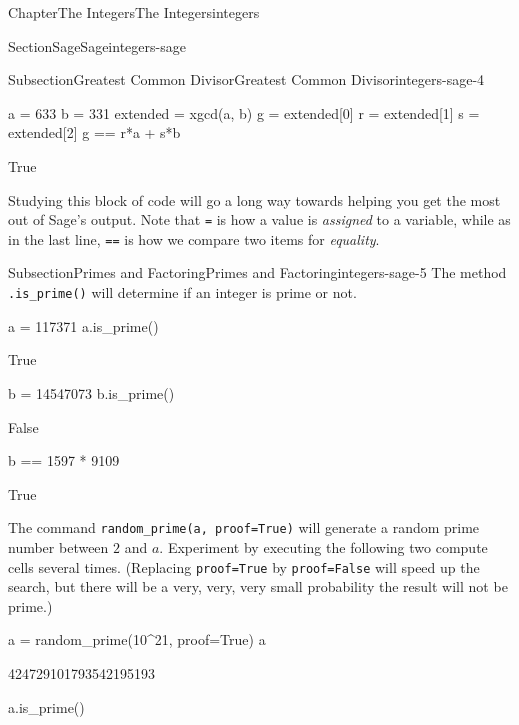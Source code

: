 \documentclass[oneside,10pt,]{book}
\newcommand{\mono}[1]{\texttt{#1}}
\numberwithin{equation}{section}
\begin{document}
\begin{chapterptx}{Chapter}{The Integers}{}{The Integers}{}{}{integers}
\begin{sectionptx}{Section}{Sage}{}{Sage}{}{}{integers-sage}
\begin{subsectionptx}{Subsection}{Greatest Common Divisor}{}{Greatest Common Divisor}{}{}{integers-sage-4}
\begin{sageinput}
a = 633
b = 331
extended = xgcd(a, b)
g = extended[0]
r = extended[1]
s = extended[2]
g == r*a + s*b
\end{sageinput}
\begin{sageoutput}
True
\end{sageoutput}
Studying this block of code will go a long way towards helping you get the most out of Sage's output.  Note that \mono{=} is how a value is \emph{assigned} to a variable, while as in the last line, \mono{==} is how we compare two items for \emph{equality}.%
\end{subsectionptx}
%
%
\typeout{************************************************}
\typeout{************************************************}
%
\begin{subsectionptx}{Subsection}{Primes and Factoring}{}{Primes and Factoring}{}{}{integers-sage-5}
The method \mono{.is\_prime()} will determine if an integer is prime or not.%
\begin{sageinput}
a = 117371
a.is_prime()
\end{sageinput}
\begin{sageoutput}
True
\end{sageoutput}
\begin{sageinput}
b = 14547073
b.is_prime()
\end{sageinput}
\begin{sageoutput}
False
\end{sageoutput}
\begin{sageinput}
b == 1597 * 9109
\end{sageinput}
\begin{sageoutput}
True
\end{sageoutput}
The command \mono{random\_prime(a, proof=True)} will generate a random prime number between \(2\) and \(a\). Experiment by executing the following two compute cells several times.  (Replacing \mono{proof=True} by \mono{proof=False} will speed up the search, but there will be a very, very, very small probability the result will not be prime.)%
\begin{sageinput}
a = random_prime(10^21, proof=True)
a
\end{sageinput}
\begin{sageoutput}
424729101793542195193
\end{sageoutput}
\begin{sageinput}
a.is_prime()
\end{sageinput}
\begin{sageoutput}

\end{sageoutput}
\end{subsectionptx}
\end{sectionptx}
\end{chapterptx}
\end{document}
